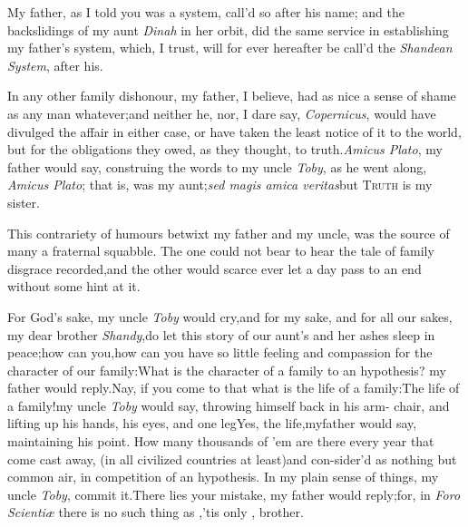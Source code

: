 \documentclass{article}
\begin{document}
\tsk My father, as I told you was a\break 
{}
system, call’d so after his name; and the backslidings of my
aunt \textit{Dinah} in her orbit, did the same service in
establishing my father’s system, which, I trust, will for ever
hereafter be call’d the \textit{Shandean System}, after his.

In any other family dishonour, my father, I believe, had as nice
a sense of shame as any man whatever;\tsh and neither he,
nor, I dare say, \textit{Copernicus}, would have divulged the affair
in either case, or have taken the least notice of it to the world,
but for the obligations they owed, as they thought, to truth.\tsk\break \textit{Amicus
Plato}, my father would say, construing the words to my uncle
\textit{Toby}, as he went along, \textit{Amicus Plato}; that
is,\break{} was my aunt;\tsk \textit{sed magis amica
veritas}\tsk but \textsc{Truth} is my
sister.\\\eject

This contrariety of humours betwixt my father and my uncle, was
the source of many a fraternal squabble. The one could not bear to
hear the tale of family disgrace recorded,\tsh and the
other would scarce ever let a day pass to an end without some hint
at it.

For God’s sake, my uncle \textit{Toby} would
cry,\tsh and for my sake, and for all our sakes, my dear
brother \textit{Shandy},\tsk do let this story of our aunt’s
and her ashes sleep in peace;\tsk how can
you,\tsh\break how can you have so little feeling and compassion
for the character of our fa\-mily:\tsh What is the character
of a family to an hypothesis? my father would\break
reply.\tsh Nay, if you come to that\tsk
\break what is the
life of a family:\tsh The life of a family!\tsk my uncle
\textit{Toby} would say, throwing himself back in his arm-
chair, and
lifting up his hands, his eyes, and one
leg\tsh Yes, the life,\tsh my\break father would say,
maintaining his point. How many thousands of ’em are there
every year that come cast away, (in all civilized countries at
least)\tsh and con-\break sider’d as nothing but common air, in
competition of an hypothesis. In my plain sense of things, my uncle
\textit{Toby},\break 
{}
commit it.\tsh There
lies your mistake, my father would reply;\tsh for, in
\textit{Foro Scientiæ} there is no such thing as
,\tsh ’tis only
, brother.
\end{document}
